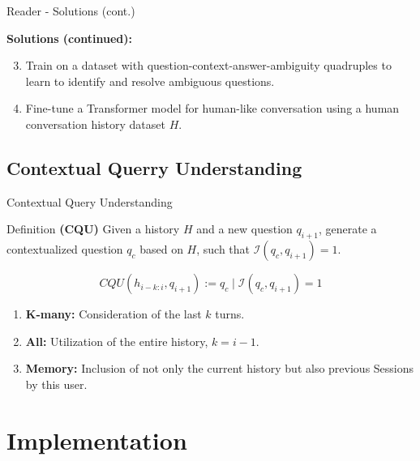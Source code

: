 \documentclass{beamer}
\begin{document}
\begin{frame}{Reader - Solutions (cont.)}

  \textbf{Solutions (continued):}

  \begin{enumerate}
    \setcounter{enumi}{2}
    \item Train on a dataset with question-context-answer-ambiguity quadruples to learn to identify and resolve ambiguous questions.
    \item Fine-tune a Transformer model for human-like conversation using a human conversation history dataset $H$.
  \end{enumerate}
  
\end{frame}


\subsection*{Contextual Querry Understanding}

\begin{frame}{Contextual Query Understanding}

  \begin{block}{Definition}
    \textbf{(CQU)} Given a history $H$ and a new question $q_{i+1}$, generate a contextualized question $q_c$ based on $H$, such that $\mathcal{I}(q_c,q_{i+1}) = 1$. 
  \end{block}

  \begin{equation*}
    CQU(h_{i-k:i}, q_{i+1}) := q_c \mid \mathcal{I}(q_c, q_{i+1}) = 1
  \end{equation*}

  \bigskip

  \begin{enumerate}
    \item \textbf{K-many:} Consideration of the last $k$ turns.
    \item \textbf{All:} Utilization of the entire history, $k = i - 1$.
    \item \textbf{Memory:} Inclusion of not only the current history but also previous Sessions by this user.
  \end{enumerate} 
\end{frame}

\section[Implementation]{Implementation}
\end{document}
